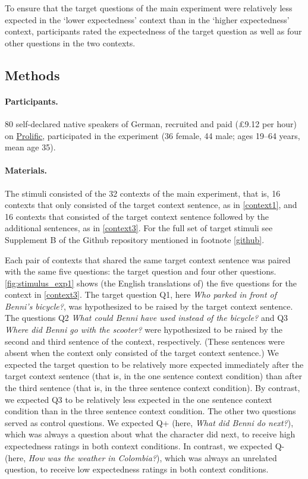 \documentclass{salt}
\begin{document}
To ensure that the target questions of the main experiment were relatively less expected in the `lower expectedness' context than in the `higher expectedness' context, participants rated the expectedness of the target question as well as four other questions in the two contexts.

\subsection{Methods}

\paragraph{Participants.}

80 self-declared native speakers of German, recruited and paid (\pounds9.12 per hour) on \href{https://www.prolific.co/}{Prolific}, participated in the experiment (36 female, 44 male; ages 19--64 years, mean age 35). 

\paragraph{Materials.}

The stimuli consisted of the 32 contexts of the main experiment, that is, 16 contexts that only consisted of the target context sentence, as in \ref{context1}, and 16 contexts that consisted of the target context sentence followed by the additional sentences, as in \ref{context3}. For the full set of target stimuli see Supplement B of the Github repository mentioned in footnote \ref{github}.  

Each pair of contexts that shared the same target context sentence was paired with the same five questions: the target question and four other questions. \autoref{fig:stimulus_exp1} shows (the English translations of) the five questions for the context in \ref{context3}. The target question Q1, here {\em Who parked in front of Benni's bicycle?}, was hypothesized to be raised by the target context sentence. The questions Q2 \textit{What could Benni have used instead of the bicycle?} and Q3 \textit{Where did Benni go with the scooter?} were hypothesized to be raised by the second and third sentence of the context, respectively. (These sentences were absent when the context only consisted of the target context sentence.) We expected the target question to be relatively more expected immediately after the target context sentence (that is, in the one sentence context condition) than after the third sentence (that is, in the three sentence context condition). By contrast, we expected Q3 to be relatively less expected in the one sentence context condition than in the three sentence context condition. The other two questions served as control questions. We expected Q+ (here, \textit{What did Benni do next?}), which was always a question about what the character did next, to receive high expectedness ratings in both context conditions. In contrast, we expected Q- (here, \textit{How was the weather in Colombia?}), which was always an unrelated question, to receive low expectedness ratings in both context conditions.
\end{document}

